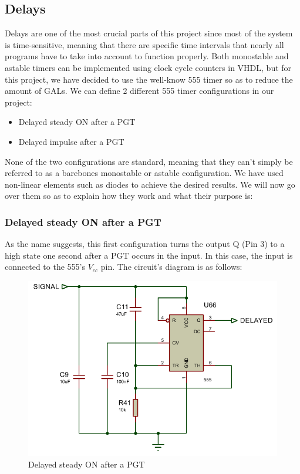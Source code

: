 \subsection{Delays}

Delays are one of the most crucial parts of this project since most of the system is time-sensitive, meaning that there are specific time intervals that nearly all programs have to take into account to function properly. Both monostable and astable timers can be implemented using clock cycle counters in VHDL, but for this project, we have decided to use the well-know 555 timer so as to reduce the amount of GALs. We can define 2 different 555 timer configurations in our project:
\begin{itemize}
    \item Delayed steady ON after a PGT
    \item Delayed impulse after a PGT
\end{itemize}

None of the two configurations are standard, meaning that they can't simply be referred to as a barebones monostable or astable configuration. We have used non-linear elements such as diodes to achieve the desired results. We will now go over them so as to explain how they work and what their purpose is:

\subsubsection{Delayed steady ON after a PGT}
\label{sec:DELAYED_STEADY}

As the name suggests, this first configuration turns the output Q (Pin 3) to a high state one second after a PGT occurs in the input. In this case, the input is connected to the 555's $V_{cc}$ pin. The circuit's diagram is as follows:

\begin{figure}[H]
    \centering
    \includegraphics[scale = 1]{Graphics/DELAY/DELAY_STEADY.PDF}
    \caption{Delayed steady ON after a PGT}
    \label{fig:DELAY_STEADY}
\end{figure}

